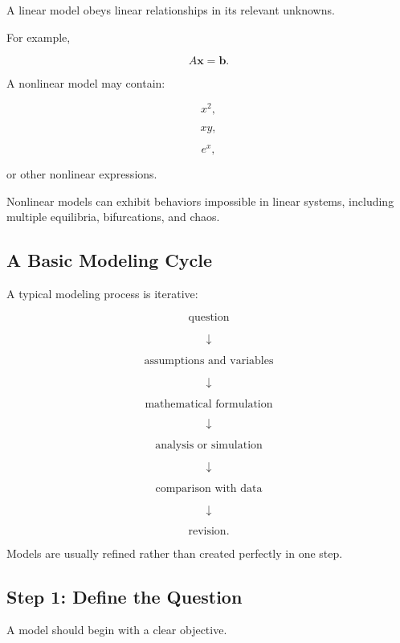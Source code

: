 A linear model obeys linear relationships in its relevant unknowns.

For example,

\[
\boxed{
A\mathbf{x}=\mathbf{b}.
}
\]

A nonlinear model may contain:

\[
\boxed{
x^2,
}
\]

\[
\boxed{
xy,
}
\]

\[
\boxed{
e^x,
}
\]

or other nonlinear expressions.

Nonlinear models can exhibit behaviors impossible in linear systems,
including multiple equilibria, bifurcations, and chaos.

\subsection{A Basic Modeling Cycle}
\label{subsec:modeling-cycle}

A typical modeling process is iterative:

\[
\boxed{
\text{question}
}
\]

\[
\downarrow
\]

\[
\boxed{
\text{assumptions and variables}
}
\]

\[
\downarrow
\]

\[
\boxed{
\text{mathematical formulation}
}
\]

\[
\downarrow
\]

\[
\boxed{
\text{analysis or simulation}
}
\]

\[
\downarrow
\]

\[
\boxed{
\text{comparison with data}
}
\]

\[
\downarrow
\]

\[
\boxed{
\text{revision}.
}
\]

Models are usually refined rather than created perfectly in one step.

\subsection{Step 1: Define the Question}
\label{subsec:modeling-define-question}

A model should begin with a clear objective.

